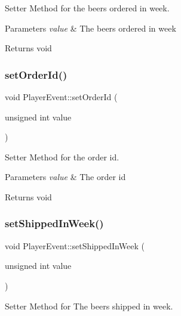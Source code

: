 Setter Method for the beers ordered in week. 


\begin{DoxyParams}{Parameters}
{\em value} & The beers ordered in week \\
\hline
\end{DoxyParams}
\begin{DoxyReturn}{Returns}
void 
\end{DoxyReturn}
\mbox{\label{classPlayerEvent_ac1e16d56dfbd072f4bf5d2f73247ff38}} 
\subsubsection{\texorpdfstring{set\+Order\+Id()}{setOrderId()}}
{\footnotesize\ttfamily void Player\+Event\+::set\+Order\+Id (\begin{DoxyParamCaption}\item[{unsigned int}]{value }\end{DoxyParamCaption})}



Setter Method for the order id. 


\begin{DoxyParams}{Parameters}
{\em value} & The order id \\
\hline
\end{DoxyParams}
\begin{DoxyReturn}{Returns}
void 
\end{DoxyReturn}
\mbox{\label{classPlayerEvent_ac84be24b1509dfbedce45a78b33426d2}} 
\subsubsection{\texorpdfstring{set\+Shipped\+In\+Week()}{setShippedInWeek()}}
{\footnotesize\ttfamily void Player\+Event\+::set\+Shipped\+In\+Week (\begin{DoxyParamCaption}\item[{unsigned int}]{value }\end{DoxyParamCaption})}



Setter Method for The beers shipped in week. 


